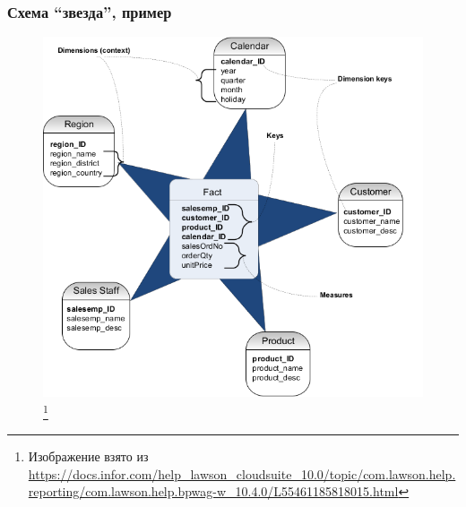 \documentclass{beamer}
\begin{document}
\begin{frame}
\frametitle{Схема ``звезда'', пример}

\begin{figure}[htb]
\includegraphics[width=\textwidth,height=0.750\textheight,keepaspectratio]{star-schema-1.png} 
\footnote{\tiny{Изображение взято из \url{https://docs.infor.com/help_lawson_cloudsuite_10.0/topic/com.lawson.help.reporting/com.lawson.help.bpwag-w_10.4.0/L55461185818015.html}}}
 \end{figure}    

\end{frame}
\end{document}
